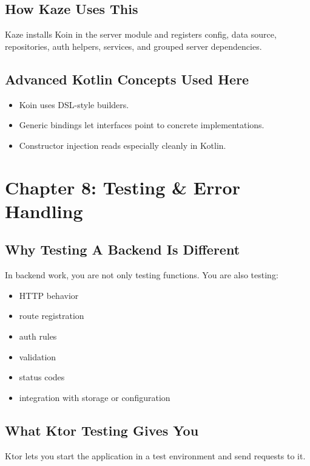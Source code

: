 \documentclass[11pt,a4paper]{article}
\begin{document}
\subsection{How Kaze Uses This}

Kaze installs Koin in the server module and registers config, data source, repositories, auth helpers, services, and grouped server dependencies.

\subsection{Advanced Kotlin Concepts Used Here}

\begin{itemize}
    \item Koin uses DSL-style builders.
    \item Generic bindings let interfaces point to concrete implementations.
    \item Constructor injection reads especially cleanly in Kotlin.
\end{itemize}

\section{Chapter 8: Testing \& Error Handling}

\subsection{Why Testing A Backend Is Different}

In backend work, you are not only testing functions. You are also testing:
\begin{itemize}
    \item HTTP behavior
    \item route registration
    \item auth rules
    \item validation
    \item status codes
    \item integration with storage or configuration
\end{itemize}

\subsection{What Ktor Testing Gives You}

Ktor lets you start the application in a test environment and send requests to it.
\end{document}
